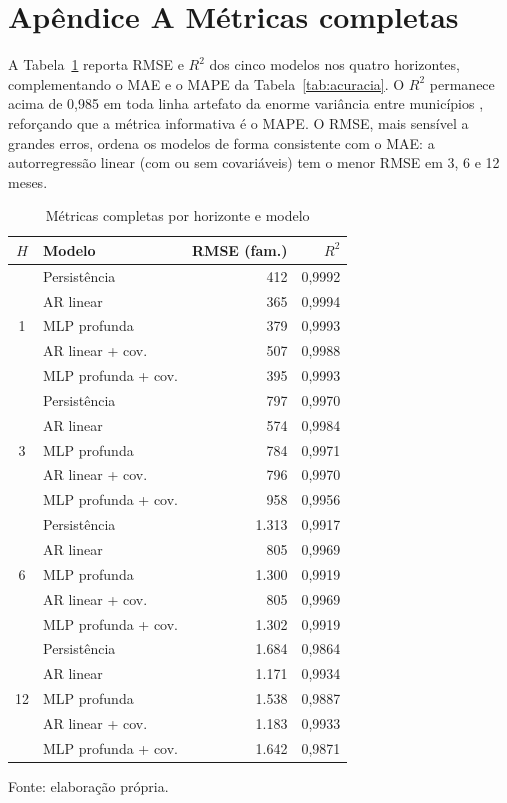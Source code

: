 \documentclass[12pt,a4paper,oneside]{article}
\begin{document}
\section*{Apêndice A \textendash{} Métricas completas}

A Tabela~\ref{tab:apA} reporta RMSE e $R^2$ dos cinco modelos nos quatro
horizontes, complementando o MAE e o MAPE da Tabela~\ref{tab:acuracia}. O
$R^2$ permanece acima de 0,985 em toda linha \textemdash{} artefato da
enorme variância entre municípios \textemdash{}, reforçando que a métrica
informativa é o MAPE. O RMSE, mais sensível a grandes erros, ordena os
modelos de forma consistente com o MAE: a autorregressão linear (com ou
sem covariáveis) tem o menor RMSE em 3, 6 e 12 meses.

\begin{table}[H]
\centering
\caption{Métricas completas por horizonte e modelo}
\label{tab:apA}
\small
\begin{tabular}{@{}clrr@{}}
\toprule
\textbf{$H$} & \textbf{Modelo} & \textbf{RMSE (fam.)} & \textbf{$R^2$} \\
\midrule
\multirow{5}{*}{1}
 & Persistência & 412 & 0,9992 \\
 & AR linear & 365 & 0,9994 \\
 & MLP profunda & 379 & 0,9993 \\
 & AR linear + cov. & 507 & 0,9988 \\
 & MLP profunda + cov. & 395 & 0,9993 \\
\midrule
\multirow{5}{*}{3}
 & Persistência & 797 & 0,9970 \\
 & AR linear & 574 & 0,9984 \\
 & MLP profunda & 784 & 0,9971 \\
 & AR linear + cov. & 796 & 0,9970 \\
 & MLP profunda + cov. & 958 & 0,9956 \\
\midrule
\multirow{5}{*}{6}
 & Persistência & 1.313 & 0,9917 \\
 & AR linear & 805 & 0,9969 \\
 & MLP profunda & 1.300 & 0,9919 \\
 & AR linear + cov. & 805 & 0,9969 \\
 & MLP profunda + cov. & 1.302 & 0,9919 \\
\midrule
\multirow{5}{*}{12}
 & Persistência & 1.684 & 0,9864 \\
 & AR linear & 1.171 & 0,9934 \\
 & MLP profunda & 1.538 & 0,9887 \\
 & AR linear + cov. & 1.183 & 0,9933 \\
 & MLP profunda + cov. & 1.642 & 0,9871 \\
\bottomrule
\end{tabular}
\par\smallskip
{\footnotesize Fonte: elaboração própria.}
\end{table}
\end{document}
